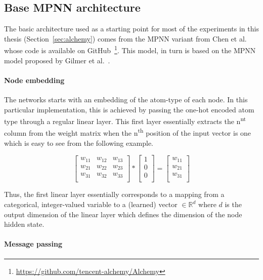 \subsection{Base MPNN architecture}
\label{sec:mpnn-architecture}

The basic architecture used as a starting point for most of the experiments in this thesis (Section~\ref{sec:alchemy}) comes from the MPNN variant from Chen et al.~\cite{Chen2019} whose code is available on GitHub~\footnote{\url{https://github.com/tencent-alchemy/Alchemy}}. This model, in turn is based on the MPNN model proposed by Gilmer et al.~\cite{Gilmer2017}.


\paragraph{Node embedding}The networks starts with an embedding of the atom-type of each node. In this particular implementation, this is achieved by passing the one-hot encoded atom type through a regular linear layer. This first layer essentially extracts the n\textsuperscript{nt} column from the weight matrix when the n\textsuperscript{th} position of the input vector is one which is easy to see from the following example.

\begin{equation}
\begin{bmatrix} 
w_{11} & w_{12} & w_{13} \\
w_{21} & w_{22} & w_{23} \\
w_{31} & w_{32} & w_{33} \\
\end{bmatrix}
*
\begin{bmatrix} 
1 \\
0 \\
0 \\
\end{bmatrix}
=
\begin{bmatrix} 
w_{11} \\
w_{21} \\
w_{31} \\
\end{bmatrix}
\end{equation}

Thus, the first linear layer essentially corresponds to a mapping from a categorical, integer-valued variable to a (learned) vector $\in \mathbb{R}^d$ where $d$ is the output dimension of the linear layer which defines the dimension of the node hidden state.

\paragraph{Message passing}


